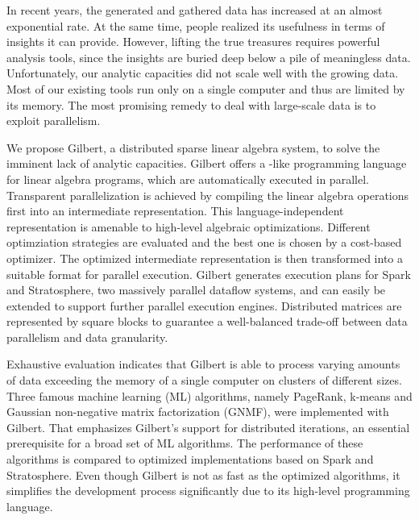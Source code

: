 \clearemptydoublepage
{}
{}

\vspace*{2cm}
\begin{center}
\end{center}
\vspace{1cm}

In recent years, the generated and gathered data has increased at an almost exponential rate.
At the same time, people realized its usefulness in terms of insights it can provide.
However, lifting the true treasures requires powerful analysis tools, since the insights are buried deep below a pile of meaningless data.
Unfortunately, our analytic capacities did not scale well with the growing data.
Most of our existing tools run only on a single computer and thus are limited by its memory.
The most promising remedy to deal with large-scale data is to exploit parallelism.

We propose Gilbert, a distributed sparse linear algebra system, to solve the imminent lack of analytic capacities.
Gilbert offers a \matlab-like programming language for linear algebra programs, which are automatically executed in parallel.
Transparent parallelization is achieved by compiling the linear algebra operations first into an intermediate representation.
This language-independent representation is amenable to high-level algebraic optimizations.
Different optimziation strategies are evaluated and the best one is chosen by a cost-based optimizer.
The optimized intermediate representation is then transformed into a suitable format for parallel execution.
Gilbert generates execution plans for Spark and Stratosphere, two massively parallel dataflow systems, and can easily be extended to support further parallel execution engines.
Distributed matrices are represented by square blocks to guarantee a well-balanced trade-off between data parallelism and data granularity.

Exhaustive evaluation indicates that Gilbert is able to process varying amounts of data exceeding the memory of a single computer on clusters of different sizes.
Three famous machine learning (ML) algorithms, namely PageRank, k-means and Gaussian non-negative matrix factorization (GNMF), were implemented with Gilbert.
That emphasizes Gilbert's support for distributed iterations, an essential prerequisite for a broad set of ML algorithms.
The performance of these algorithms is compared to optimized implementations based on Spark and Stratosphere.
Even though Gilbert is not as fast as the optimized algorithms, it simplifies the development process significantly due to its high-level programming language.